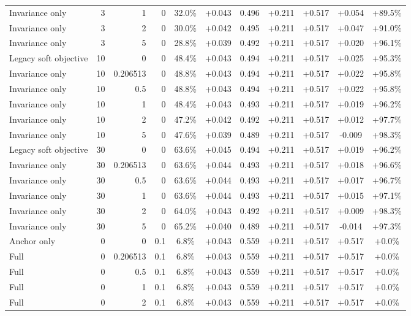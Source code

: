 \begin{table}[htbp]
\begin{tabular}{lrrrccccccc}
Invariance only & 3 & 1 & 0 & 32.0\% & +0.043 & 0.496 & +0.211 & +0.517 & +0.054 & +89.5\% \\
Invariance only & 3 & 2 & 0 & 30.0\% & +0.042 & 0.495 & +0.211 & +0.517 & +0.047 & +91.0\% \\
Invariance only & 3 & 5 & 0 & 28.8\% & +0.039 & 0.492 & +0.211 & +0.517 & +0.020 & +96.1\% \\
Legacy soft objective & 10 & 0 & 0 & 48.4\% & +0.043 & 0.494 & +0.211 & +0.517 & +0.025 & +95.3\% \\
Invariance only & 10 & 0.206513 & 0 & 48.8\% & +0.043 & 0.494 & +0.211 & +0.517 & +0.022 & +95.8\% \\
Invariance only & 10 & 0.5 & 0 & 48.8\% & +0.043 & 0.494 & +0.211 & +0.517 & +0.022 & +95.8\% \\
Invariance only & 10 & 1 & 0 & 48.4\% & +0.043 & 0.493 & +0.211 & +0.517 & +0.019 & +96.2\% \\
Invariance only & 10 & 2 & 0 & 47.2\% & +0.042 & 0.492 & +0.211 & +0.517 & +0.012 & +97.7\% \\
Invariance only & 10 & 5 & 0 & 47.6\% & +0.039 & 0.489 & +0.211 & +0.517 & -0.009 & +98.3\% \\
Legacy soft objective & 30 & 0 & 0 & 63.6\% & +0.045 & 0.494 & +0.211 & +0.517 & +0.019 & +96.2\% \\
Invariance only & 30 & 0.206513 & 0 & 63.6\% & +0.044 & 0.493 & +0.211 & +0.517 & +0.018 & +96.6\% \\
Invariance only & 30 & 0.5 & 0 & 63.6\% & +0.044 & 0.493 & +0.211 & +0.517 & +0.017 & +96.7\% \\
Invariance only & 30 & 1 & 0 & 63.6\% & +0.044 & 0.493 & +0.211 & +0.517 & +0.015 & +97.1\% \\
Invariance only & 30 & 2 & 0 & 64.0\% & +0.043 & 0.492 & +0.211 & +0.517 & +0.009 & +98.3\% \\
Invariance only & 30 & 5 & 0 & 65.2\% & +0.040 & 0.489 & +0.211 & +0.517 & -0.014 & +97.3\% \\
Anchor only & 0 & 0 & 0.1 & 6.8\% & +0.043 & 0.559 & +0.211 & +0.517 & +0.517 & +0.0\% \\
Full & 0 & 0.206513 & 0.1 & 6.8\% & +0.043 & 0.559 & +0.211 & +0.517 & +0.517 & +0.0\% \\
Full & 0 & 0.5 & 0.1 & 6.8\% & +0.043 & 0.559 & +0.211 & +0.517 & +0.517 & +0.0\% \\
Full & 0 & 1 & 0.1 & 6.8\% & +0.043 & 0.559 & +0.211 & +0.517 & +0.517 & +0.0\% \\
Full & 0 & 2 & 0.1 & 6.8\% & +0.043 & 0.559 & +0.211 & +0.517 & +0.517 & +0.0\% \\

\end{tabular}
\end{table}
